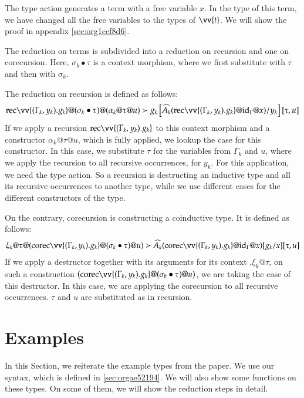 \documentclass[a4paper,cleardoubleempty,BCOR1cm]{scrbook}
\begin{document}
The type action generates a term with a free variable \(x\).  In the type of
this term, we have changed all the free variables to the types of \(\vv{t}\).
We will show the proof in appendix \ref{sec:org1cef8d6}.

The reduction on terms  is subdivided into a reduction on recursion and one
on corecursion. Here, \(\sigma_k \bullet\tau\) is a context morphism, where we
first substitute with \(\tau\) and then with \(\sigma_k\).

The reduction on recursion is defined as follows:
\begin{align*}
  \rec \vv{(\Gamma_k,y_k).g_k}@(\sigma_k\bullet\tau)@(\alpha_k@\tau@u)\succ g_k\left[ \widehat{A_k}(\rec\vv{(\Gamma_k,y_k).g_k}@\id{\Gamma}@x)/y_k \right][\tau,u]\\
\end{align*}
If we apply a recursion \(\rec \vv{(\Gamma_k,y_k).g_k}\) to this context
morphism and a constructor \(\alpha_k@\tau@u\), which is fully applied, we
lookup the case for this constructor. In this case, we substitute \(\tau\) for
the variables from \(\Gamma_k\) and \(u\), where we apply the recursion to all
recursive occurrences, for \(y_k\). For this application, we need the type
action. So a recursion is destructing an inductive type and all its recursive
occurrences to another type, while we use different cases for the different
constructors of the type.

On the contrary, corecursion is constructing a coinductive type. It is defined
as follows:
\begin{align*}
  \xi_k@\tau@(\corec \vv{(\Gamma_k,y_k).g_k}@(\sigma_k\bullet\tau)@u)\succ \widehat{A_k}(\corec\vv{(\Gamma_k,y_k).g_k}@\id{\Gamma}@x)[g_k/x] [\tau,u]
\end{align*}
If we apply a destructor together with its arguments for its context
,\(\xi_k@\tau\), on such a construction \((\corec
   \vv{(\Gamma_k,y_k).g_k}@(\sigma_k\bullet\tau)@u)\), we are taking the case of
this destructor. In this case, we are applying the corecursion to all
recursive occurrences. \(\tau\) and \(u\) are substituted as in recursion.

\chapter{Examples}
\label{sec:org2b99924}

In this Section, we reiterate the example types from the paper.  We use our
syntax, which is defined in \ref{sec:orgae52194}.  We will also show some functions
on these types.  On some of them, we will show the reduction steps in detail.
\end{document}
